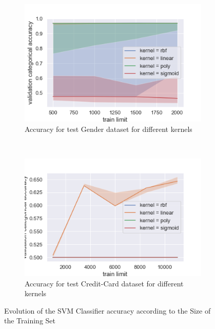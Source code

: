 \documentclass[10pt]{article}
\begin{document}
		\paragraph*{}
			\begin{figure}[h]
				\centering
				\begin{subfigure}[]{0.45\columnwidth}
					\centering
					\includegraphics[width=\linewidth]{../graphics/svm_gender_train_limit_score_type_kernel.png}
					\caption{Accuracy for test Gender dataset for different kernels}
					\label{svm:g_train_limit}
				\end{subfigure}
				~
				\begin{subfigure}[]{0.45\columnwidth}
					\centering
					\includegraphics[width=\linewidth]{../graphics/svm_creditcard_train_limit_score_type_kernel.png}
					\caption{Accuracy for test Credit-Card dataset for different kernels}
					\label{svm:cc_train_limit}
				\end{subfigure}
				\caption{Evolution of the SVM Classifier accuracy according to the Size of the Training Set}
				\label{svm:train_limit}
			\end{figure}
\end{document}
